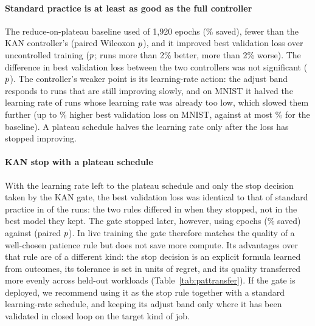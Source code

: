 \paragraph{Standard practice is at least as good as the full controller} The reduce-on-plateau baseline used  of 1{,}920 epochs (\% saved), fewer than the KAN controller's  (paired Wilcoxon $p\X{PL@kanplat@pep}$), and it improved best validation loss over uncontrolled training ($p\X{PL@plat@p}$;  runs more than 2\% better,  more than 2\% worse). The difference in best validation loss between the two controllers was not significant ($p\X{PL@kanplat@ploss}$). The controller's weaker point is its learning-rate action: the adjust band responds to runs that are still improving slowly, and on MNIST it halved the learning rate of runs whose learning rate was already too low, which slowed them further (up to \% higher best validation loss on MNIST, against at most \% for the baseline). A plateau schedule halves the learning rate only after the loss has stopped improving.

\paragraph{KAN stop with a plateau schedule} With the learning rate left to the plateau schedule and only the stop decision taken by the KAN gate, the best validation loss was identical to that of standard practice in  of the  runs: the two rules differed in when they stopped, not in the best model they kept. The gate stopped later, however, using  epochs (\% saved) against  (paired $p\X{PL@ksplat@pep}$). In live training the gate therefore matches the quality of a well-chosen patience rule but does not save more compute. Its advantages over that rule are of a different kind: the stop decision is an explicit formula learned from outcomes, its tolerance is set in units of regret, and its quality transferred more evenly across held-out workloads (Table~\ref{tab:pattransfer}). If the gate is deployed, we recommend using it as the stop rule together with a standard learning-rate schedule, and keeping its adjust band only where it has been validated in closed loop on the target kind of job.
